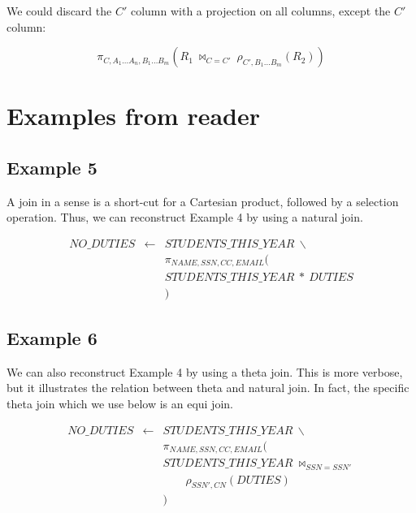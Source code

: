 \documentclass[11pt]{article}
\begin{document}
We could discard the $C'$ column with a projection on all columns, except the $C'$ column:

\begin{displaymath}
\pi_{C, A_{1} \ldots A_{n}, B_{1} \ldots B_{m}} ( R_{1} \ \Join_{C=C'} \ \rho_{C',B_{1} \ldots B_{m}}(R_{2}) )
\end{displaymath}


\newpage

\appendix
\section{Examples from reader}

\subsection{Example 5}\label{xmpl:five}

A join in a sense is a short-cut for a Cartesian product, followed by a selection operation. Thus, we can reconstruct Example 4 by using a natural join.

\begin{eqnarray*}
NO\_DUTIES & \gets & STUDENTS\_THIS\_YEAR \ \backslash \\
& & \pi_{NAME,SSN,CC,EMAIL}( \\
& & STUDENTS\_THIS\_YEAR \ \ast \ DUTIES \\
& & )
\end{eqnarray*}

\subsection{Example 6}\label{xmpl:six}

We can also reconstruct Example 4 by using a theta join. This is more verbose, but it illustrates the relation between theta and natural join. In fact, the specific theta join which we use below is an equi join.

\begin{eqnarray*}
NO\_DUTIES & \gets & STUDENTS\_THIS\_YEAR \ \backslash \\
& & \pi_{NAME,SSN,CC,EMAIL}( \\
& & STUDENTS\_THIS\_YEAR \ \Join_{SSN=SSN'} \\
& & \qquad \rho_{SSN',CN}(DUTIES) \\
& & )
\end{eqnarray*}
\end{document}
